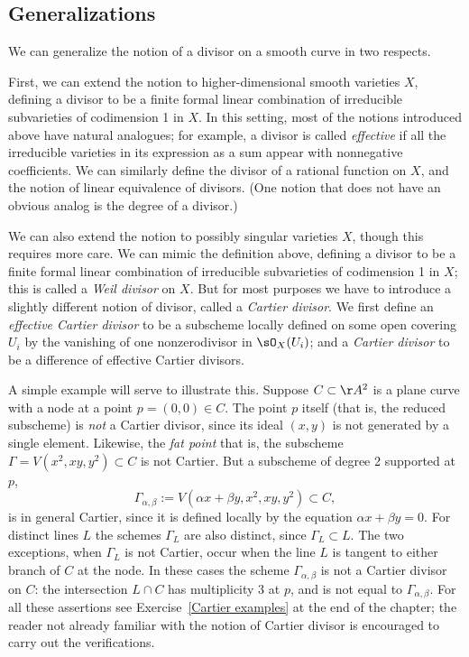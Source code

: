 \subsection*{Generalizations}

We can generalize the notion of a divisor on a smooth curve in two respects.

First, we can extend the notion to higher-dimensional smooth varieties
$X$, defining a divisor to be a finite formal linear combination of
irreducible subvarieties of codimension 1 in $X$. In this setting,
most of the notions introduced above have natural analogues; for
%
example, a divisor is called \emph{effective} if all the irreducible
varieties in its expression as a sum appear with nonnegative
coefficients. We can similarly define the divisor of a rational
function on $X$, and the notion of linear equivalence of divisors.
(One notion that does not have an obvious analog is the degree of a divisor.)

We can also extend the notion to possibly singular varieties $X$,
though this requires more care. We can mimic the definition above,
defining a divisor to be a finite formal linear combination of
irreducible subvarieties of codimension 1 in $X$; this is called a
%
\emph{Weil divisor} on $X$. But for most purposes we have to introduce
a slightly different notion of divisor, called a \emph{Cartier
  divisor}. We first define an \emph{effective Cartier divisor} to be
%
a subscheme locally defined on some open covering $U_{i}$ by the
vanishing of one nonzerodivisor in $\sO_{X}(U_{i})$; and a
\emph{Cartier divisor} to be a difference of effective Cartier divisors.

A simple example will serve to illustrate this. Suppose $C \subset
\AA^2$ is a plane curve with a node at a point $p = (0,0) \in C$. The
point $p$ itself (that is, the reduced subscheme) is \emph{not} a
Cartier divisor, since its ideal $(x,y)$ is not generated by a single
element. Likewise, the
%
\emph{fat point}
\emdash that is, the subscheme $\Gamma = V(x^2, xy, y^2) \subset C$
\emdash is not Cartier. But a subscheme of degree 2 supported at $p$,
$$
\Gamma_{\alpha, \beta} := V(\alpha x + \beta y, x^2, xy, y^2) \subset C,
$$ 
\emdash 
is in general Cartier, 
since
it is defined locally by the equation $\alpha x + \beta y = 0$. 
For distinct lines $L$ the schemes $\Gamma_{L}$ are also distinct,
since $\Gamma_{L}\subset L$. The two exceptions, when $\Gamma_{L}$ is
not Cartier, occur when the line $L$ is tangent to either branch of
$C$ at the node. 
In these cases the scheme $\Gamma_{\alpha, \beta}$ is not a Cartier
divisor on $C$: the intersection $L \cap C$ has multiplicity 3 at $p$,
and is not equal to $\Gamma_{\alpha, \beta}$. 
For all these assertions see
Exercise~\ref{Cartier examples} 
at the end of the chapter; 
the reader
not already familiar with the notion of Cartier divisor is
encouraged to carry out the verifications. 

